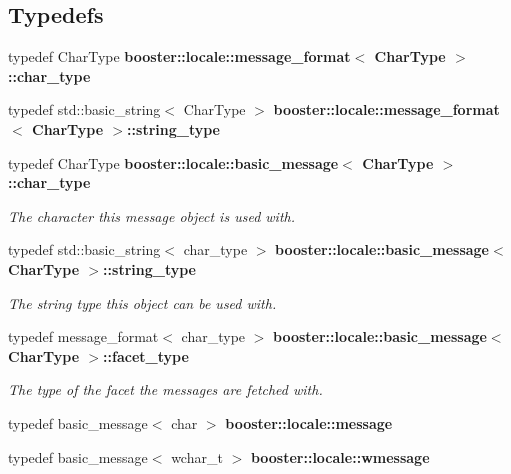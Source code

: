 \subsection*{Typedefs}
\begin{DoxyCompactItemize}
\item 
typedef Char\+Type {\bf booster\+::locale\+::message\+\_\+format$<$ Char\+Type $>$\+::char\+\_\+type}
\item 
typedef std\+::basic\+\_\+string$<$ Char\+Type $>$ {\bf booster\+::locale\+::message\+\_\+format$<$ Char\+Type $>$\+::string\+\_\+type}
\item 
typedef Char\+Type {\bf booster\+::locale\+::basic\+\_\+message$<$ Char\+Type $>$\+::char\+\_\+type}\label{group__message_ga5cb546ceb92830ddf7ea2913e6651b9e}

\begin{DoxyCompactList}\small\item\em The character this message object is used with. \end{DoxyCompactList}\item 
typedef std\+::basic\+\_\+string$<$ char\+\_\+type $>$ {\bf booster\+::locale\+::basic\+\_\+message$<$ Char\+Type $>$\+::string\+\_\+type}\label{group__message_ga90b2267af78f4df23fb621e3c1443707}

\begin{DoxyCompactList}\small\item\em The string type this object can be used with. \end{DoxyCompactList}\item 
typedef message\+\_\+format$<$ char\+\_\+type $>$ {\bf booster\+::locale\+::basic\+\_\+message$<$ Char\+Type $>$\+::facet\+\_\+type}\label{group__message_ga07188bff8c00be4a1b81323d45525b65}

\begin{DoxyCompactList}\small\item\em The type of the facet the messages are fetched with. \end{DoxyCompactList}\item 
typedef basic\+\_\+message$<$ char $>$ {\bf booster\+::locale\+::message}
\item 
typedef basic\+\_\+message$<$ wchar\+\_\+t $>$ {\bf booster\+::locale\+::wmessage}
\end{DoxyCompactItemize}
